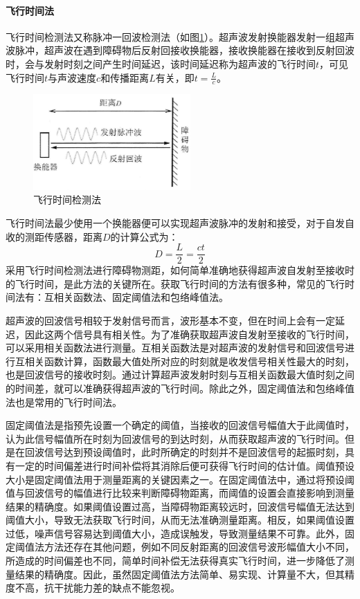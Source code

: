     
    \paragraph{飞行时间法}
    飞行时间检测法又称脉冲一回波检测法（如图\ref{飞行时间检测法}）。超声波发射换能器发射一组超声波脉冲，超声波在遇到障碍物后反射回接收换能器，接收换能器在接收到反射回波时，会与发射时刻之间产生时间延迟，该时间延迟称为超声波的飞行时间$t$，可见飞行时间$t$与声波速度$c$和传播距离$L$有关，即$t=\frac{L}{c}$。\par
    \begin{figure}[!h]
    	\centering
    	\includegraphics[width=6cm]{figure/飞行时间检测法.png}
    	\caption{飞行时间检测法}
    	\label{飞行时间检测法}
    \end{figure}\par
    飞行时间法最少使用一个换能器便可以实现超声波脉冲的发射和接受，对于自发自收的测距传感器，距离$D$的计算公式为：
    \begin{equation}
    	D=\frac{L}{2}=\frac{ct}{2}
    \end{equation}
	采用飞行时间检测法进行障碍物测距，如何简单准确地获得超声波自发射至接收时的飞行时间，是此方法的关键所在。获取飞行时间的方法有很多种，常见的飞行时间法有：互相关函数法、固定阈值法和包络峰值法。\par
	超声波的回波信号相较于发射信号而言，波形基本不变，但在时间上会有一定延迟，因此这两个信号具有相关性。为了准确获取超声波自发射至接收的飞行时间，可以采用相关函数法进行测量。互相关函数法是对超声波的发射信号和回波信号进行互相关函数计算，函数最大值处所对应的时刻就是收发信号相关性最大的时刻，也是回波信号的接收时刻。通过计算超声波发射时刻与互相关函数最大值时刻之间的时间差，就可以准确获得超声波的飞行时间。除此之外，固定阈值法和包络峰值法也是常用的飞行时间法。\par
	固定阈值法是指预先设置一个确定的阈值，当接收的回波信号幅值大于此阈值时，认为此信号幅值所在时刻为回波信号的到达时刻，从而获取超声波的飞行时间。但是在回波信号达到预设阈值时，此时所确定的时刻并不是回波信号的起振时刻，具有一定的时间偏差进行时间补偿将其消除后便可获得飞行时间的估计值。阈值预设大小是固定阈值法用于测量距离的关键因素之一。在固定阈值法中，通过将预设阈值与回波信号的幅值进行比较来判断障碍物距离，而阈值的设置会直接影响到测量结果的精确度。如果阈值设置过高，当障碍物距离较远时，回波信号幅值无法达到阈值大小，导致无法获取飞行时间，从而无法准确测量距离。相反，如果阈值设置过低，噪声信号容易达到阈值大小，造成误触发，导致测量结果不可靠。此外，固定阈值法方法还存在其他问题，例如不同反射距离的回波信号波形幅值大小不同，所造成的时间偏差也不同，简单时间补偿无法获得真实飞行时间，进一步降低了测量结果的精确度。因此，虽然固定阈值法方法简单、易实现、计算量不大，但其精度不高，抗干扰能力差的缺点不能忽视。\par
